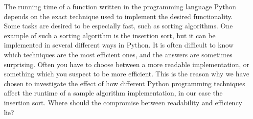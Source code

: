 The running time of a function written in the programming language Python depends on the exact technique used to implement the desired functionality. Some tasks are desired to be especially fast, such as sorting algorithms. One example of such a sorting algorithm is the insertion sort, but it can be implemented in several different ways in Python. 
It is often difficult to know which techniques are the most efficient ones, and the answers are sometimes surprising. Often you have to choose between a more readable implementation, or something which you suspect to be more efficient. This is the reason why we have chosen to investigate the effect of how different Python programming techniques affect the runtime of a sample algorithm implementation, in our case the insertion sort. Where should the compromise between readability and efficiency lie?
